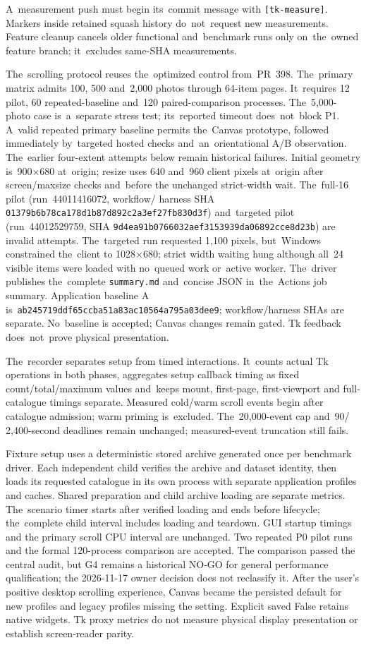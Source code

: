 \documentclass[11pt,a4paper]{article}
\newcommand{\codeword}[1]{\nolinkurl{#1}}
\begin{document}
A~measurement push must begin its~commit message with
\codeword{[tk-measure]}. Markers inside retained squash history do~not~request
new measurements. Feature cleanup cancels older functional and~benchmark
runs only on~the~owned feature branch; it~excludes same-SHA measurements.

The~scrolling protocol reuses the~optimized control from~PR~398. The~primary
matrix admits 100, 500 and~2,000 photos through 64-item pages. It~requires
12 pilot, 60 repeated-baseline and~120 paired-comparison processes. The~5,000-photo
case is~a~separate stress test; its~reported timeout does~not~block P1.
A~valid repeated primary baseline permits the~Canvas prototype, followed
immediately by~targeted hosted checks and~an~orientational A/B observation.
The~earlier four-extent attempts below remain historical failures. Initial geometry is~900×680 at~origin; resize uses 640
and~960 client pixels at~origin after screen/maxsize checks and~before the
unchanged strict-width wait. The~full-16 pilot (run~44011416072, workflow/
harness SHA \codeword{01379b6b78ca178d1b87d892c2a3ef27fb830d3f}) and~targeted
pilot (run~44012529759, SHA
\codeword{9d4ea91b0766032aef3153939da06892cce8d23b}) are invalid attempts.
The~targeted run requested 1,100 pixels, but~Windows constrained the~client to
1028×680; strict width waiting hung although all~24 visible items were loaded
with no~queued work or~active worker. The~driver publishes the~complete
\codeword{summary.md} and~concise JSON in~the~Actions job summary.
Application baseline A is~\codeword{ab245719ddf65ccba51a83ac10564a795a03dee9};
workflow/harness SHAs are separate. No~baseline is accepted; Canvas changes
remain gated. Tk feedback does~not~prove physical presentation.

The~recorder separates setup from timed interactions. It~counts actual Tk
operations in both phases, aggregates setup callback timing as fixed
count/total/maximum values and~keeps mount, first-page, first-viewport and
full-catalogue timings separate. Measured cold/warm scroll events begin after
catalogue admission; warm priming is~excluded. The~20,000-event cap and~90/
2,400-second deadlines remain unchanged; measured-event truncation still fails.

Fixture setup uses a deterministic stored archive generated once per benchmark
driver. Each independent child verifies the archive and dataset identity, then
loads its requested catalogue in its own process with separate application
profiles and caches. Shared preparation and child archive loading are separate
metrics. The~scenario timer starts after verified loading and ends before
lifecycle; the~complete child interval includes loading and teardown. GUI startup timings
and the primary scroll CPU interval are unchanged. Two repeated P0 pilot runs
and the formal 120-process comparison are accepted. The comparison passed the
central audit, but G4 remains a historical NO-GO for general performance
qualification; the 2026-11-17 owner decision does not reclassify it. After the
user's positive desktop scrolling experience, Canvas became the persisted
default for new profiles and legacy profiles missing the setting. Explicit
saved False retains native widgets. Tk proxy metrics do not measure physical
display presentation or establish screen-reader parity.
\end{document}
